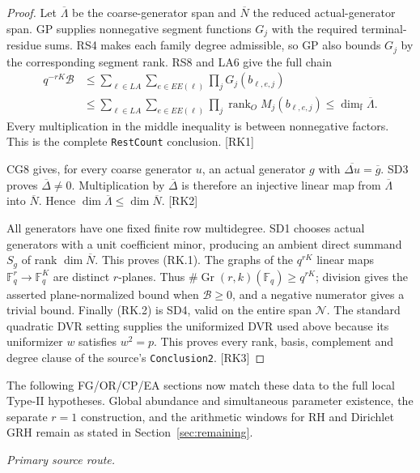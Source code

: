 \documentclass[11pt,a4paper]{article}
\numberwithin{equation}{section}
\theoremstyle{remark}\newtheorem{remark}[theorem]{Remark}
\begin{document}
\begin{proof}
Let $\overline\Lambda$ be the coarse-generator span and $\overline N$
the reduced actual-generator span. GP supplies nonnegative segment
functions $G_j$ with the required terminal-residue sums. RS4 makes each
family degree admissible, so GP also bounds $G_j$ by the corresponding
segment rank. RS8 and LA6 give the full chain
\[
\begin{aligned}
 q^{-rK}\mathcal B
 &\le\sum_{\ell\in LA}\sum_{e\in EE(\ell)}\prod_jG_j(b_{\ell,e,j})\\
 &\le\sum_{\ell\in LA}\sum_{e\in EE(\ell)}
                  \prod_j\operatorname{rank}_O M_j(b_{\ell,e,j})
 \le\dim_{\mathbb f}\overline\Lambda.
\end{aligned}\tag{RK.3}
\]
Every multiplication in the middle inequality is between nonnegative
factors. This is the complete \texttt{RestCount} conclusion. \textsf{[RK1]}

CG8 gives, for every coarse generator $u$, an actual generator $g$ with
$\overline{\Delta u}=\overline g$. SD3 proves $\overline\Delta\ne0$.
Multiplication by $\overline\Delta$ is therefore an injective linear map
from $\overline\Lambda$ into $\overline N$. Hence
$\dim\overline\Lambda\le\dim\overline N$. \textsf{[RK2]}

All generators have one fixed finite row multidegree. SD1 chooses actual
generators with a unit coefficient minor, producing an ambient direct
summand $S_g$ of rank $\dim\overline N$. This proves (RK.1).
The graphs of the $q^{rK}$ linear maps $\mathbb F_q^r\to\mathbb F_q^K$
are distinct $r$-planes. Thus $\#\operatorname{Gr}(r,k)(\mathbb F_q)
\ge q^{rK}$; division gives the asserted plane-normalized bound when
$\mathcal B\ge0$, and a negative numerator gives a trivial bound.
Finally (RK.2) is SD4, valid on the entire span $\mathcal N$.
The standard quadratic DVR setting supplies the uniformized DVR used
above because its uniformizer $w$ satisfies $w^2=p$.
This proves every rank, basis, complement and degree clause of the
source's \texttt{Conclusion2}. \textsf{[RK3]}
\end{proof}

The following FG/OR/CP/EA sections now match these data to the full
local Type-II hypotheses. Global abundance and simultaneous parameter
existence, the separate $r=1$ construction, and the arithmetic windows for
RH and Dirichlet GRH remain as stated in Section~\ref{sec:remaining}.


\noindent\textit{Primary source route.}\cite{rank-closure}
\end{document}
